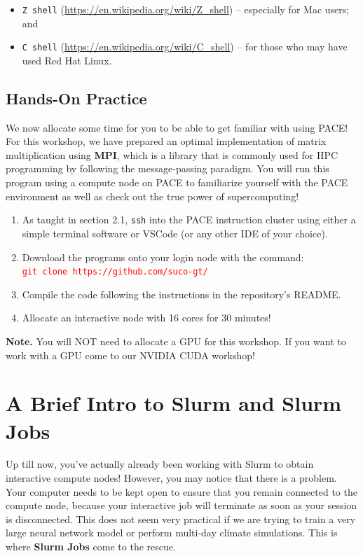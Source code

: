 \documentclass{article}
\begin{document}
\begin{itemize}
    \item \texttt{Z shell} (\url{https://en.wikipedia.org/wiki/Z_shell}) -- especially for Mac users; and
    \item \texttt{C shell} (\url{https://en.wikipedia.org/wiki/C_shell}) -- for those who may have used Red Hat Linux.
\end{itemize}

\subsection{Hands-On Practice}

We now allocate some time for you to be able to get familiar with using PACE! For this workshop, we have prepared an optimal implementation of matrix multiplication using \textbf{MPI}, which is a library that is commonly used for HPC programming by following the message-passing paradigm. You will run this program using a compute node on PACE to familiarize yourself with the PACE environment as well as check out the true power of supercomputing!

\begin{enumerate}
    \item As taught in section 2.1, \texttt{ssh} into the PACE instruction cluster using either a simple terminal software or VSCode (or any other IDE of your choice).
    \item Download the programs onto your login node with the command: \\ \textcolor{red}{\texttt{git clone https://github.com/suco-gt/}}
    \item Compile the code following the instructions in the repository's README. 
    \item Allocate an interactive node with 16 cores for 30 minutes!
\end{enumerate}

\noindent \textbf{Note.} You will NOT need to allocate a GPU for this workshop. If you want to work with a GPU come to our NVIDIA CUDA workshop!

\section{A Brief Intro to Slurm and Slurm Jobs}

Up till now, you've actually already been working with Slurm to obtain interactive compute nodes! However, you may notice that there is a problem. Your computer needs to be kept open to ensure that you remain connected to the compute node, because your interactive job will terminate as soon as your session is disconnected. This does not seem very practical if we are trying to train a very large neural network model or perform multi-day climate simulations. This is where \textbf{Slurm Jobs} come to the rescue. 
\end{document}
